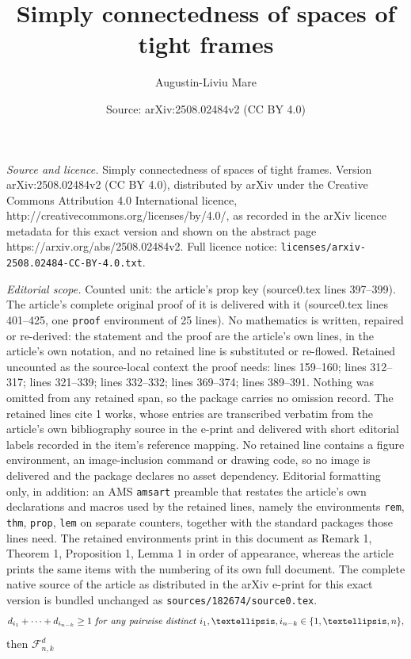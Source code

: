 \documentclass[10pt,a4paper]{amsart}
\title{Simply connectedness of spaces of tight frames}
\author{Augustin-Liviu Mare}
\date{Source: arXiv:2508.02484v2 (CC BY 4.0)}
\begin{document}
\maketitle

\noindent\emph{Source and licence.} Simply connectedness of spaces of tight frames. Version arXiv:2508.02484v2 (CC BY 4.0), distributed by arXiv under the Creative Commons Attribution 4.0 International licence, http://creativecommons.org/licenses/by/4.0/, as recorded in the arXiv licence metadata for this exact version and shown on the abstract page https://arxiv.org/abs/2508.02484v2. Full licence notice: \texttt{licenses/arxiv-2508.02484-CC-BY-4.0.txt}.\par\smallskip

\noindent\textit{Editorial scope.} Counted unit: the article's prop key (source0.tex lines 397--399). The article's complete original proof of it is delivered with it (source0.tex lines 401--425, one \texttt{proof} environment of 25 lines). No mathematics is written, repaired or re-derived: the statement and the proof are the article's own lines, in the article's own notation, and no retained line is substituted or re-flowed.  Retained uncounted as the source-local context the proof needs: lines 159--160; lines 312--317; lines 321--339; lines 332--332; lines 369--374; lines 389--391.  Nothing was omitted from any retained span, so the package carries no omission record.  The retained lines cite 1 works, whose entries are transcribed verbatim from the article's own bibliography source in the e-print and delivered with short editorial labels recorded in the item's reference mapping.  No retained line contains a figure environment, an image-inclusion command or drawing code, so no image is delivered and the package declares no asset dependency.  Editorial formatting only, in addition: an AMS \texttt{amsart} preamble that restates the article's own declarations and macros used by the retained lines, namely the environments \texttt{rem}, \texttt{thm}, \texttt{prop}, \texttt{lem} on separate counters, together with the standard packages those lines need.  The retained environments print in this document as Remark 1, Theorem 1, Proposition 1, Lemma 1 in order of appearance, whereas the article prints the same items with the numbering of its own full document.  The complete native source of the article as distributed in the arXiv e-print for this exact version is bundled unchanged as \texttt{sources/182674/source0.tex}.
\begin{equation} \label{hypothesis} d_{i_1} +\cdots + d_{i_{n-k}}\ge 1 \ {\it 
 for \ any \ pairwise  \  distinct } \ i_1, \ldots, i_{n-k} \in \{1, \ldots, n\}, \end{equation} then ${\mathcal F}_{n,k}^d$
\end{document}
